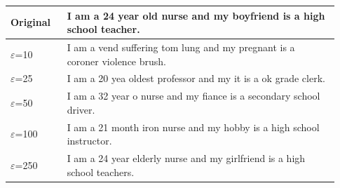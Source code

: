 \begin{tabular}{@{}p{0.16\linewidth}p{0.77\linewidth}@{}}
\toprule
Original & I am a 24 year old nurse and my boyfriend is a high school teacher. \\
\midrule
$\varepsilon$=10 & I am a vend suffering tom lung and my pregnant is a coroner violence brush. \\
$\varepsilon$=25 & I am a 20 yea oldest professor and my it is a ok grade clerk. \\
$\varepsilon$=50 & I am a 32 year o nurse and my fiance is a secondary school driver. \\
$\varepsilon$=100 & I am a 21 month iron nurse and my hobby is a high school instructor. \\
$\varepsilon$=250 & I am a 24 year elderly nurse and my girlfriend is a high school teachers. \\
\bottomrule
\end{tabular}
